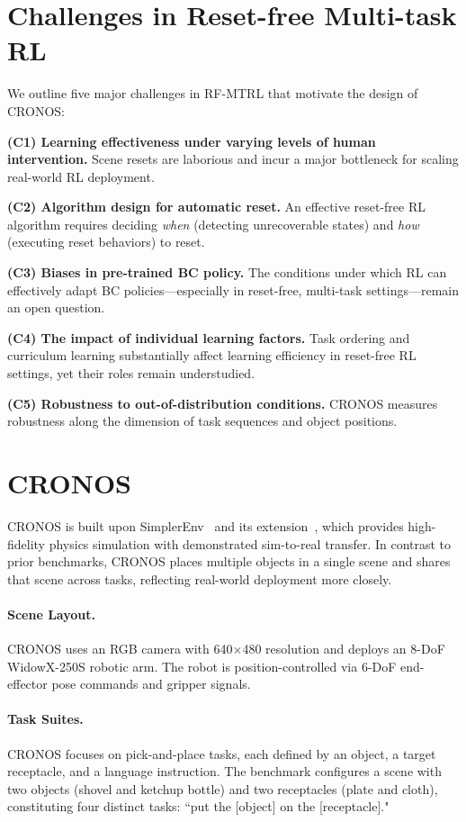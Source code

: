 \section{Challenges in Reset-free Multi-task RL}

We outline five major challenges in RF-MTRL that motivate the design of CRONOS:

\textbf{(C1) Learning effectiveness under varying levels of human intervention.} Scene resets are laborious and incur a major bottleneck for scaling real-world RL deployment.

\textbf{(C2) Algorithm design for automatic reset.} An effective reset-free RL algorithm requires deciding \emph{when} (detecting unrecoverable states) and \emph{how} (executing reset behaviors) to reset.

\textbf{(C3) Biases in pre-trained BC policy.} The conditions under which RL can effectively adapt BC policies—especially in reset-free, multi-task settings—remain an open question.

\textbf{(C4) The impact of individual learning factors.} Task ordering and curriculum learning substantially affect learning efficiency in reset-free RL settings, yet their roles remain understudied.

\textbf{(C5) Robustness to out-of-distribution conditions.} CRONOS measures robustness along the dimension of task sequences and object positions.

\section{CRONOS}

CRONOS is built upon SimplerEnv~\cite{li2024simpler} and its extension~\cite{liu2025rlvla}, which provides high-fidelity physics simulation with demonstrated sim-to-real transfer. In contrast to prior benchmarks, CRONOS places multiple objects in a single scene and shares that scene across tasks, reflecting real-world deployment more closely.

\paragraph{Scene Layout.}
CRONOS uses an RGB camera with 640$\times$480 resolution and deploys an 8-DoF WidowX-250S robotic arm. The robot is position-controlled via 6-DoF end-effector pose commands and gripper signals.

\paragraph{Task Suites.}
CRONOS focuses on pick-and-place tasks, each defined by an object, a target receptacle, and a language instruction. The benchmark configures a scene with two objects (shovel and ketchup bottle) and two receptacles (plate and cloth), constituting four distinct tasks: ``put the [object] on the [receptacle]."

